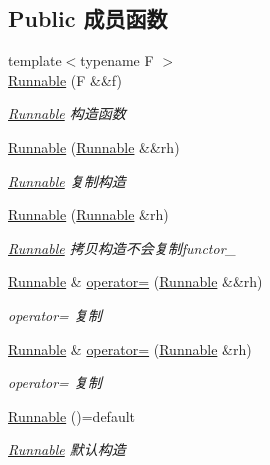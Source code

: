 \subsection*{Public 成员函数}
\begin{DoxyCompactItemize}
\item 
{\footnotesize template$<$typename F $>$ }\\\hyperlink{classRunnable_ab052afa8b53dd1e7c28e978962839446}{Runnable} (F \&\&f)
\begin{DoxyCompactList}\small\item\em \hyperlink{classRunnable}{Runnable} 构造函数 \end{DoxyCompactList}\item 
\hyperlink{classRunnable_a6d6ce997a7873530a2f339412e6c4935}{Runnable} (\hyperlink{classRunnable}{Runnable} \&\&rh)
\begin{DoxyCompactList}\small\item\em \hyperlink{classRunnable}{Runnable} 复制构造 \end{DoxyCompactList}\item 
\hyperlink{classRunnable_a9e4d88b5d30d6e0368c5d22a0df203ee}{Runnable} (\hyperlink{classRunnable}{Runnable} \&rh)
\begin{DoxyCompactList}\small\item\em \hyperlink{classRunnable}{Runnable} 拷贝构造不会复制functor\+\_\+ \end{DoxyCompactList}\item 
\hyperlink{classRunnable}{Runnable} \& \hyperlink{classRunnable_a572b61c98700ada8d241b122ddc80e2c}{operator=} (\hyperlink{classRunnable}{Runnable} \&\&rh)
\begin{DoxyCompactList}\small\item\em operator= 复制 \end{DoxyCompactList}\item 
\hyperlink{classRunnable}{Runnable} \& \hyperlink{classRunnable_a4dca857ef9f64534673170bc3c8b72a1}{operator=} (\hyperlink{classRunnable}{Runnable} \&rh)
\begin{DoxyCompactList}\small\item\em operator= 复制 \end{DoxyCompactList}\item 
\mbox{\label{classRunnable_a5769222dcc4b2adca7723bfbdfa00cbb}} 
\hyperlink{classRunnable_a5769222dcc4b2adca7723bfbdfa00cbb}{Runnable} ()=default
\begin{DoxyCompactList}\small\item\em \hyperlink{classRunnable}{Runnable} 默认构造 \end{DoxyCompactList}\item 

\end{DoxyCompactItemize}
